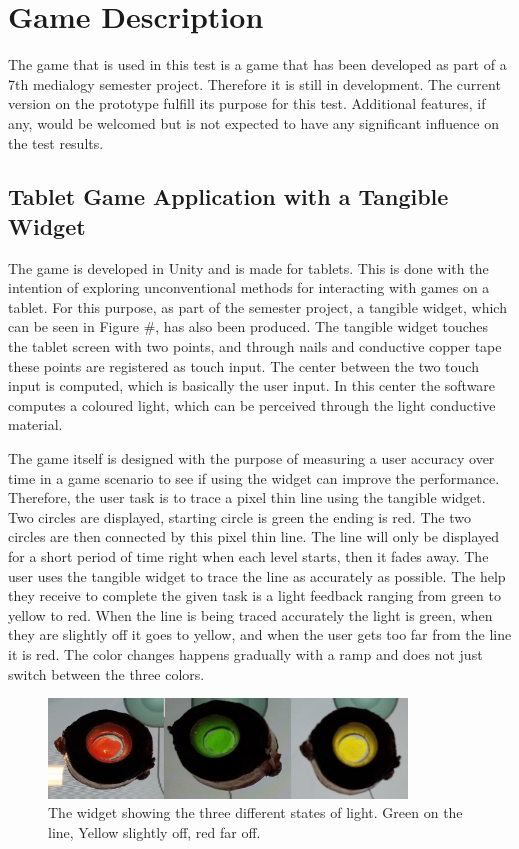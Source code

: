 \section*{Game Description}
The game that is used in this test is a game that has been developed as part of a 7th medialogy semester project. Therefore it is still in development. The current version on the prototype fulfill its purpose for this test. Additional features, if any, would be welcomed but is not expected to have any significant influence on the test results.

\subsection*{Tablet Game Application with a Tangible Widget}
The game is developed in Unity and is made for tablets. This is done with the intention of exploring unconventional methods for interacting with games on a tablet. For this purpose, as part of the semester project, a tangible widget, which can be seen in Figure \#, has also been produced. The tangible widget touches the tablet screen with two points, and through nails and conductive copper tape these points are registered as touch input. The center between the two touch input is computed, which is basically the user input. In this center the software computes a coloured light, which can be perceived through the light conductive material.  

The game itself is designed with the purpose of measuring a user accuracy over time in a game scenario to see if using the widget can improve the performance. Therefore, the user task is to trace a pixel thin line using the tangible widget. Two circles are displayed, starting circle is green the ending is red. The two circles are then connected by this pixel thin line. The line will only be displayed for a short period of time right when each level starts, then it fades away. The user uses the tangible widget to trace the line as accurately as possible. The help they receive to complete the given task is a light feedback ranging from green to yellow to red. When the line is being traced accurately the light is green, when they are slightly off it goes to yellow, and when the user gets too far from the line it is red. The color changes happens gradually with a ramp and does not just switch between the three colors. 

\begin{figure}[!h]
\includegraphics[width=0.85\textwidth]{img/lights}
\caption{The widget showing the three different states of light. Green on the line, Yellow slightly off, red far off.}
\end{figure}

